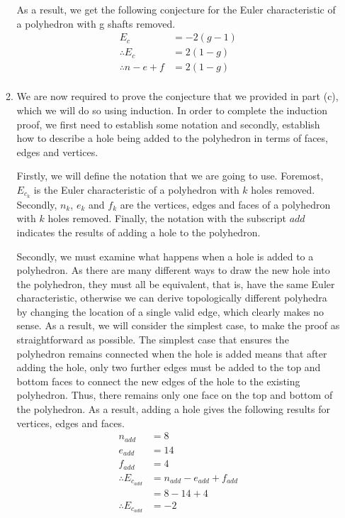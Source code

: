 \documentclass[a4paper]{article}
\begin{document}
\begin{enumerate}[label=\textbf{\arabic*.}]
\begin{enumerate}
		As a result, we get the following conjecture for the Euler characteristic of a polyhedron with g shafts removed.
		\begin{align*}
		E_{c} & = -2(g-1)\\
		\therefore E_{c} & = 2(1-g)\\
		\therefore n - e + f & = 2(1-g)\\
		\end{align*}

		\bigbreak

		\item We are now required to prove the conjecture that we provided in part (c), which we will do so using induction. In order to complete the induction proof, we first need to establish some notation and secondly, establish how to describe a hole being added to the polyhedron in terms of faces, edges and vertices.

		\bigbreak

		Firstly, we will define the notation that we are going to use. Foremost, $\displaystyle{E_{c_{k}}}$ is the Euler characteristic of a polyhedron with $\displaystyle{k}$ holes removed. Secondly, $\displaystyle{n_{k}}$, $\displaystyle{e_{k}}$ and $\displaystyle{f_{k}}$ are the vertices, edges and faces of a polyhedron with $\displaystyle{k}$ holes removed. Finally, the notation with the subscript $\displaystyle{add}$ indicates the results of adding a hole to the polyhedron.

		\bigbreak

		Secondly, we must examine what happens when a hole is added to a polyhedron. As there are many different ways to draw the new hole into the polyhedron, they must all be equivalent, that is, have the same Euler characteristic, otherwise we can derive topologically different polyhedra by changing the location of a single valid edge, which clearly makes no sense. As a result, we will consider the simplest case, to make the proof as straightforward as possible. The simplest case that ensures the polyhedron remains connected when the hole is added means that after adding the hole, only two further edges must be added to the top and bottom faces to connect the new edges of the hole to the existing polyhedron. Thus, there remains only one face on the top and bottom of the polyhedron. As a result, adding a hole gives the following results for vertices, edges and faces.
		\begin{align*}
		n_{add} & = 8\\
		e_{add} & = 14\\
		f_{add} & = 4\\
		\therefore E_{c_{add}} & = n_{add} - e_{add} + f_{add}\\
		& = 8 - 14 + 4\\
		\therefore E_{c_{add}} & = -2\\
		\end{align*}


\end{enumerate}
\end{enumerate}
\end{document}
